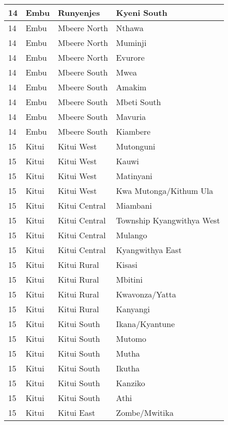 \begin{table}[!ht]
\begin{tabular}{|l|l|l|l|}
        14 & Embu & Runyenjes & Kyeni South \\ \hline
        14 & Embu & Mbeere North & Nthawa \\ \hline
        14 & Embu & Mbeere North & Muminji \\ \hline
        14 & Embu & Mbeere North & Evurore \\ \hline
        14 & Embu & Mbeere South & Mwea \\ \hline
        14 & Embu & Mbeere South & Amakim \\ \hline
        14 & Embu & Mbeere South & Mbeti South \\ \hline
        14 & Embu & Mbeere South & Mavuria \\ \hline
        14 & Embu & Mbeere South & Kiambere \\ \hline
        15 & Kitui & Kitui West & Mutonguni \\ \hline
        15 & Kitui & Kitui West & Kauwi \\ \hline
        15 & Kitui & Kitui West & Matinyani \\ \hline
        15 & Kitui & Kitui West & Kwa Mutonga/Kithum Ula \\ \hline
        15 & Kitui & Kitui Central & Miambani \\ \hline
        15 & Kitui & Kitui Central & Township Kyangwithya West \\ \hline
        15 & Kitui & Kitui Central & Mulango \\ \hline
        15 & Kitui & Kitui Central & Kyangwithya East \\ \hline
        15 & Kitui & Kitui Rural & Kisasi \\ \hline
        15 & Kitui & Kitui Rural & Mbitini \\ \hline
        15 & Kitui & Kitui Rural & Kwavonza/Yatta \\ \hline
        15 & Kitui & Kitui Rural & Kanyangi \\ \hline
        15 & Kitui & Kitui South & Ikana/Kyantune \\ \hline
        15 & Kitui & Kitui South & Mutomo \\ \hline
        15 & Kitui & Kitui South & Mutha \\ \hline
        15 & Kitui & Kitui South & Ikutha \\ \hline
        15 & Kitui & Kitui South & Kanziko \\ \hline
        15 & Kitui & Kitui South & Athi \\ \hline
        15 & Kitui & Kitui East & Zombe/Mwitika \\ \hline

\end{tabular}
\end{table}
